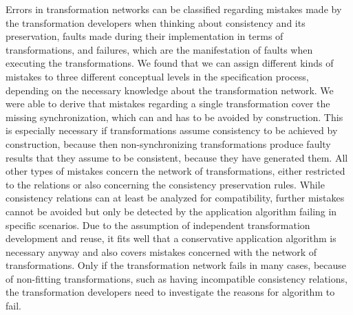 \begin{insight}[Errors]
    Errors in transformation networks can be classified regarding mistakes made by the transformation developers when thinking about consistency and its preservation, faults made during their implementation in terms of transformations, and failures, which are the manifestation of faults when executing the transformations.
    We found that we can assign different kinds of mistakes to three different conceptual levels in the specification process, depending on the necessary knowledge about the transformation network.
    We were able to derive that mistakes regarding a single transformation cover the missing synchronization, which can and has to be avoided by construction.
    This is especially necessary if transformations assume consistency to be achieved by construction, because then non-synchronizing transformations produce faulty results that they assume to be consistent, because they have generated them.
    All other types of mistakes concern the network of transformations, either restricted to the relations or also concerning the consistency preservation rules.
    While consistency relations can at least be analyzed for compatibility, further mistakes cannot be avoided but only be detected by the application algorithm failing in specific scenarios.
    Due to the assumption of independent transformation development and reuse, it fits well that a conservative application algorithm is necessary anyway and also covers mistakes concerned with the network of transformations.
    Only if the transformation network fails in many cases, because of non-fitting transformations, such as having incompatible consistency relations, the transformation developers need to investigate the reasons for algorithm to fail.
\end{insight}